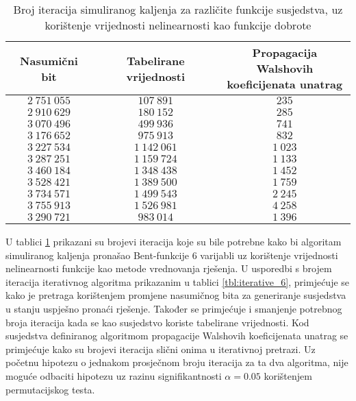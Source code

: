 \begin{table}[]
    \centering
    \captionsetup{justification=centering}
    \caption{Broj iteracija simuliranog kaljenja za različite funkcije susjedstva, uz korištenje vrijednosti nelinearnosti kao funkcije dobrote}
    \begin{tabular}{ccc} \hline
        Nasumični bit & Tabelirane vrijednosti & \makecell{Propagacija Walshovih \\ koeficijenata unatrag} \\ \hline
        $2\:751\:055$ &    $107\:891$ &    $235$ \\
        $2\:910\:629$ &    $180\:152$ &    $285$ \\
        $3\:070\:496$ &    $499\:936$ &    $741$ \\
        $3\:176\:652$ &    $975\:913$ &    $832$ \\
        $3\:227\:534$ & $1\:142\:061$ & $1\:023$ \\
        $3\:287\:251$ & $1\:159\:724$ & $1\:133$ \\
        $3\:460\:184$ & $1\:348\:438$ & $1\:452$ \\
        $3\:528\:421$ & $1\:389\:500$ & $1\:759$ \\
        $3\:734\:571$ & $1\:499\:543$ & $2\:245$ \\
        $3\:755\:913$ & $1\:526\:981$ & $4\:258$ \\ \hline
        $3\:290\:721$ &    $983\:014$ & $1\:396$
    \end{tabular}
    \label{tbl:simaneal_6_nonl}
\end{table}
U tablici \ref{tbl:simaneal_6_nonl} prikazani su brojevi iteracija koje su bile potrebne kako bi algoritam simuliranog kaljenja pronašao Bent-funkcije 6 varijabli uz korištenje vrijednosti nelinearnosti funkcije kao metode vrednovanja rješenja.
U usporedbi s brojem iteracija iterativnog algoritma prikazanim u tablici \ref{tbl:iterative_6}, primjećuje se kako je pretraga korištenjem promjene nasumičnog bita za generiranje susjedstva u stanju uspješno pronaći rješenje.
Također se primjećuje i smanjenje potrebnog broja iteracija kada se kao susjedstvo koriste tabelirane vrijednosti.
Kod susjedstva definiranog algoritmom propagacije Walshovih koeficijenata unatrag se primjećuje kako su brojevi iteracija slični onima u iterativnoj pretrazi.
Uz početnu hipotezu o jednakom prosječnom broju iteracija za ta dva algoritma, nije moguće odbaciti hipotezu uz razinu signifikantnosti $\alpha = 0.05$ korištenjem permutacijskog testa.


